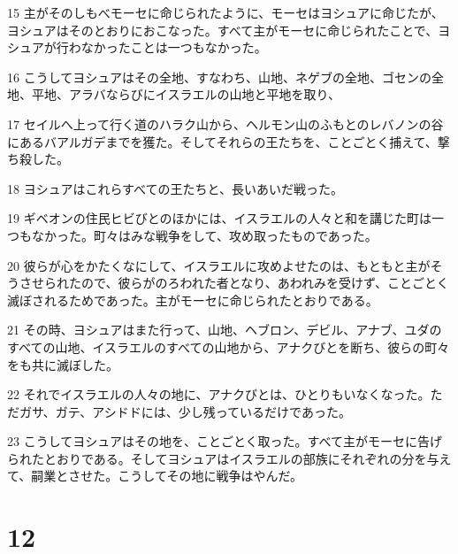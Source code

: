 \par 15 主がそのしもべモーセに命じられたように、モーセはヨシュアに命じたが、ヨシュアはそのとおりにおこなった。すべて主がモーセに命じられたことで、ヨシュアが行わなかったことは一つもなかった。
\par 16 こうしてヨシュアはその全地、すなわち、山地、ネゲブの全地、ゴセンの全地、平地、アラバならびにイスラエルの山地と平地を取り、
\par 17 セイルへ上って行く道のハラク山から、ヘルモン山のふもとのレバノンの谷にあるバアルガデまでを獲た。そしてそれらの王たちを、ことごとく捕えて、撃ち殺した。
\par 18 ヨシュアはこれらすべての王たちと、長いあいだ戦った。
\par 19 ギベオンの住民ヒビびとのほかには、イスラエルの人々と和を講じた町は一つもなかった。町々はみな戦争をして、攻め取ったものであった。
\par 20 彼らが心をかたくなにして、イスラエルに攻めよせたのは、もともと主がそうさせられたので、彼らがのろわれた者となり、あわれみを受けず、ことごとく滅ぼされるためであった。主がモーセに命じられたとおりである。
\par 21 その時、ヨシュアはまた行って、山地、ヘブロン、デビル、アナブ、ユダのすべての山地、イスラエルのすべての山地から、アナクびとを断ち、彼らの町々をも共に滅ぼした。
\par 22 それでイスラエルの人々の地に、アナクびとは、ひとりもいなくなった。ただガサ、ガテ、アシドドには、少し残っているだけであった。
\par 23 こうしてヨシュアはその地を、ことごとく取った。すべて主がモーセに告げられたとおりである。そしてヨシュアはイスラエルの部族にそれぞれの分を与えて、嗣業とさせた。こうしてその地に戦争はやんだ。

\chapter{12}

